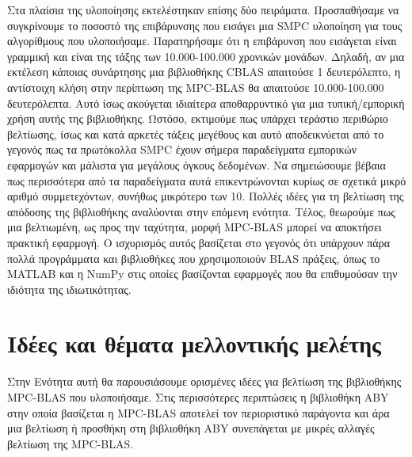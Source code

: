 Στα πλαίσια της υλοποίησης εκτελέστηκαν επίσης δύο πειράματα. Προσπαθήσαμε να συγκρίνουμε το ποσοστό της επιβάρυνσης που εισάγει μια SMPC υλοποίηση για τους αλγορίθμους που υλοποιήσαμε. Παρατηρήσαμε ότι η επιβάρυνση που εισάγεται είναι γραμμική και είναι της τάξης των 10.000-100.000 χρονικών μονάδων. Δηλαδή, αν μια εκτέλεση κάποιας συνάρτησης μια βιβλιοθήκης CBLAS απαιτούσε 1 δευτερόλεπτο, η αντίστοιχη κλήση στην περίπτωση της MPC-BLAS θα απαιτούσε 10.000-100.000 δευτερόλεπτα. Αυτό ίσως ακούγεται ιδιαίτερα αποθαρρυντικό για μια τυπική/εμπορική χρήση αυτής της βιβλιοθήκης. Ωστόσο, εκτιμούμε πως υπάρχει τεράστιο περιθώριο βελτίωσης, ίσως και κατά αρκετές τάξεις μεγέθους και αυτό αποδεικνύεται από το γεγονός πως τα πρωτόκολλα SMPC έχουν σήμερα παραδείγματα εμπορικών εφαρμογών και μάλιστα για μεγάλους όγκους δεδομένων. Να σημειώσουμε βέβαια πως περισσότερα από τα παραδείγματα αυτά επικεντρώνονται κυρίως σε σχετικά μικρό αριθμό συμμετεχόντων, συνήθως μικρότερο των 10. Πολλές ιδέες για τη βελτίωση της απόδοσης της βιβλιοθήκης αναλύονται στην επόμενη ενότητα. Τέλος, θεωρούμε πως μια βελτιωμένη, ως προς την ταχύτητα, μορφή MPC-BLAS μπορεί να αποκτήσει πρακτική εφαρμογή. Ο ισχυρισμός αυτός βασίζεται στο γεγονός ότι υπάρχουν πάρα πολλά προγράμματα και βιβλιοθήκες που χρησιμοποιούν BLAS πράξεις, όπως το MATLAB και η NumPy στις οποίες βασίζονται εφαρμογές που θα επιθυμούσαν την ιδιότητα της ιδιωτικότητας.

\section{Ιδέες και θέματα μελλοντικής μελέτης}

Στην Ενότητα αυτή θα παρουσιάσουμε ορισμένες ιδέες για βελτίωση της βιβλιοθήκης MPC-BLAS που υλοποιήσαμε. Στις περισσότερες περιπτώσεις η βιβλιοθήκη ABY στην οποία βασίζεται η MPC-BLAS αποτελεί τον περιοριστικό παράγοντα και άρα μια βελτίωση ή προσθήκη στη βιβλιοθήκη ABY συνεπάγεται με μικρές αλλαγές βελτίωση της MPC-BLAS.

